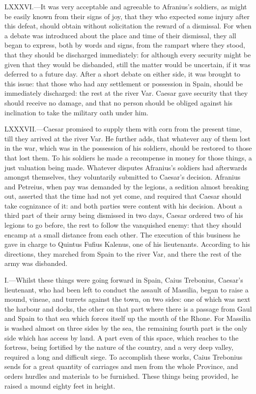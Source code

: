 LXXXVI.—It was very acceptable and agreeable to Afranius's soldiers, as
might be easily known from their signs of joy, that they who expected
some injury after this defeat, should obtain without solicitation the
reward of a dismissal. For when a debate was introduced about the place
and time of their dismissal, they all began to express, both by words
and signs, from the rampart where they stood, that they should be
discharged immediately: for although every security might be given that
they would be disbanded, still the matter would be uncertain, if it was
deferred to a future day. After a short debate on either side, it was
brought to this issue: that those who had any settlement or possession
in Spain, should be immediately discharged: the rest at the river Var.
Caesar gave security that they should receive no damage, and that no
person should be obliged against his inclination to take the military
oath under him.

LXXXVII.—Caesar promised to supply them with corn from the present
time, till they arrived at the river Var. He further adds, that whatever
any of them lost in the war, which was in the possession of his
soldiers, should be restored to those that lost them. To his soldiers he
made a recompense in money for those things, a just valuation being
made. Whatever disputes Afranius's soldiers had afterwards amongst
themselves, they voluntarily submitted to Caesar's decision. Afranius
and Petreius, when pay was demanded by the legions, a sedition almost
breaking out, asserted that the time had not yet come, and required that
Caesar should take cognizance of it: and both parties were content with
his decision. About a third part of their army being dismissed in two
days, Caesar ordered two of his legions to go before, the rest to follow
the vanquished enemy: that they should encamp at a small distance from
each other. The execution of this business he gave in charge to Quintus
Fufius Kalenus, one of his lieutenants. According to his directions,
they marched from Spain to the river Var, and there the rest of the army
was disbanded.


I.—Whilst these things were going forward in Spain, Caius Trebonius,
Caesar's lieutenant, who had been left to conduct the assault of
Massilia, began to raise a mound, vineae, and turrets against the town,
on two sides: one of which was next the harbour and docks, the other on
that part where there is a passage from Gaul and Spain to that sea which
forces itself up the mouth of the Rhone. For Massilia is washed almost
on three sides by the sea, the remaining fourth part is the only side
which has access by land. A part even of this space, which reaches to
the fortress, being fortified by the nature of the country, and a very
deep valley, required a long and difficult siege. To accomplish these
works, Caius Trebonius sends for a great quantity of carriages and men
from the whole Province, and orders hurdles and materials to be
furnished. These things being provided, he raised a mound eighty feet in
height.

